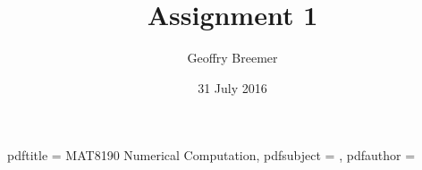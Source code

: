 \newcommand{\usqcoursecode}{MAT8190}
\newcommand{\usqcoursedescription}{Numerical Computation}
\title{Assignment 1}
\author{Geoffry Breemer}
\newcommand{\usqstudentnumber}{0061082147}
\newcommand{\usqstudentemail}{u1082147@umail.usq.edu.au}
\newcommand{\usqacademicyear}{2016}
\newcommand{\usqacademicsemester}{2}
\date{31 July 2016}
\newcommand{\usqpreparedfor}{Dr Harry Butler}
\newcommand{\usqpreparedforposition}{Senior Lecturer (Mathematics and Computing)}
\newcommand{\usqpreparedfororganisation}{School of Agricultural, Computational and Environmental}
\makeatletter
\hypersetup
{
  pdftitle   =  \usqcoursecode{} \usqcoursedescription,
  pdfsubject = \@title,
  pdfauthor  = \@author
}
\makeatother